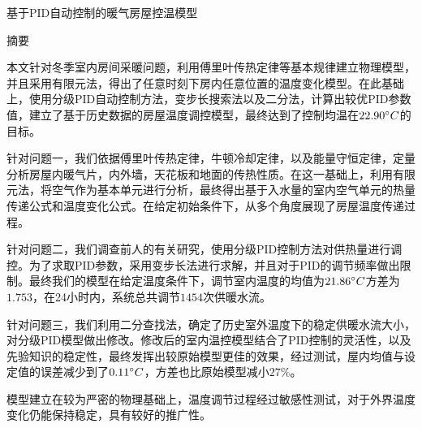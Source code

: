 \documentclass{my_paper}
\newcommand{\lunwenbiaoti}{\fontsize{15.75pt}{0}\heiti 基于PID自动控制的暖气房屋控温模型}
\newcommand{\zhaiyao}{\fontsize{14pt}{0}\heiti 摘要}
\begin{document}
\newpage
\begin{center}
\lunwenbiaoti

\vspace{2ex}
\zhaiyao
\end{center}

本文针对冬季室内房间采暖问题，利用傅里叶传热定律等基本规律建立物理模型，并且采用有限元法，得出了任意时刻下房内任意位置的温度变化模型。在此基础上，使用分级PID自动控制方法，变步长搜索法以及二分法，计算出较优PID参数值，建立了基于历史数据的房屋温度调控模型，最终达到了控制均温在$22.90\degree C$的目标。

针对问题一，我们依据傅里叶传热定律，牛顿冷却定律，以及能量守恒定律，定量分析房屋内暖气片，内外墙，天花板和地面的传热性质。在这一基础上，利用有限元法，将空气作为基本单元进行分析，最终得出基于入水量的室内空气单元的热量传递公式和温度变化公式。在给定初始条件下，从多个角度展现了房屋温度传递过程。

针对问题二，我们调查前人的有关研究，使用分级PID控制方法对供热量进行调控。为了求取PID参数，采用变步长法进行求解，并且对于PID的调节频率做出限制。最终我们的模型在给定温度条件下，调节室内温度的均值为$21.86\degree C$方差为$1.753$，在24小时内，系统总共调节$1454$次供暖水流。

针对问题三，我们利用二分查找法，确定了历史室外温度下的稳定供暖水流大小，对分级PID模型做出修改。修改后的室内温控模型结合了PID控制的灵活性，以及先验知识的稳定性，最终发挥出较原始模型更佳的效果，经过测试，屋内均值与设定值的误差减少到了$0.11\degree C$，方差也比原始模型减小$27\%$。

模型建立在较为严密的物理基础上，温度调节过程经过敏感性测试，对于外界温度变化仍能保持稳定，具有较好的推广性。
\end{document}
